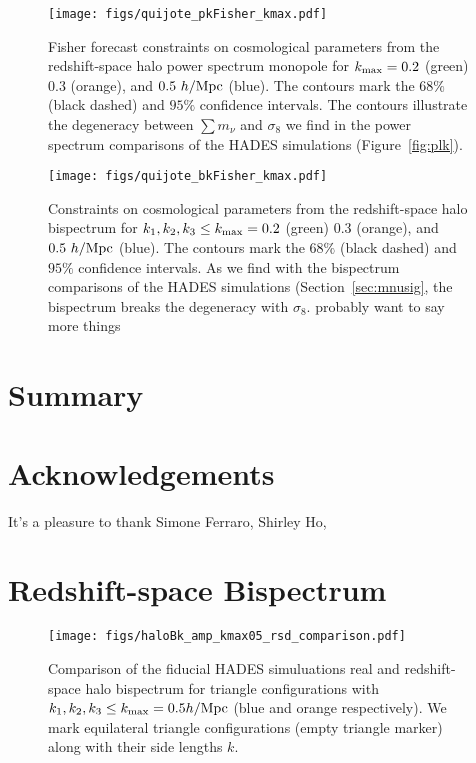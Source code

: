 \documentclass[12pt, letterpaper, preprint]{aastex62}
\newcommand{\smnu}{\sum m_\nu}
\newcommand{\sig}{\sigma_8}
\newcommand{\ch}[1]{{\color{orange}{\bf CH:} #1}}
\begin{document}
\begin{figure}
\begin{center}
    \texttt{[image: figs/quijote\_pkFisher\_kmax.pdf]} 
    \caption{Fisher forecast constraints on cosmological parameters from the 
    redshift-space halo power spectrum monopole for $k_{\rm max} = 0.2$ (green) 0.3 (orange), 
    and $0.5~h/{\rm Mpc}$ (blue). The contours mark the $68\%$ (black dashed) and $95\%$ 
    confidence intervals. The contours illustrate the degeneracy between $\smnu$ and $\sig$ 
    we find  in the power spectrum comparisons of the HADES simulations (Figure~\ref{fig:plk}).}
\label{fig:pk_fish_kmax}
\end{center}
\end{figure}


\begin{figure}
\begin{center}
    \texttt{[image: figs/quijote\_bkFisher\_kmax.pdf]} 
    \caption{Constraints on cosmological parameters from the redshift-space
    halo bispectrum for $k_1, k_2, k_3 \leq k_{\rm max} = 0.2$ (green) 0.3 (orange), 
    and $0.5~h/{\rm Mpc}$ (blue). The contours mark the $68\%$ (black dashed) and $95\%$ 
    confidence intervals. As we find with the bispectrum comparisons of the HADES 
    simulations (Section~\ref{sec:mnusig}, the bispectrum breaks the degeneracy 
    with $\sig$. \ch{probably want to say more things}}
\label{fig:bk_fish_kmax}
\end{center}
\end{figure}

\section{Summary} 


\section*{Acknowledgements}
It's a pleasure to thank 
    Simone Ferraro, 
    Shirley Ho, 

\appendix
\section{Redshift-space Bispectrum} 
\begin{figure}
\begin{center}
    \texttt{[image: figs/haloBk\_amp\_kmax05\_rsd\_comparison.pdf]}
    \caption{Comparison of the fiducial HADES simuluations real and redshift-space halo
    bispectrum for triangle configurations with $k_1, k_2, k_3 \leq k_{\rm max} = 0.5 h/{\rm Mpc}$ 
    (blue and orange respectively). We mark equilateral triangle configurations (empty 
    triangle marker) along with their side lengths $k$.
    }
\label{fig:cov_converge}
\end{center}
\end{figure}
\end{document}
